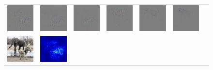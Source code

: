 \begin{figure}
\begin{center}
\begin{tabular}{ccccccc}
\includegraphics[width=0.14\linewidth,height=0.11\linewidth]{figs/examples/alexnet/soft/zeb-ele2_diff_341} &
\includegraphics[width=0.14\linewidth,height=0.11\linewidth]{figs/examples/vggnet/soft/zeb-ele2_diff_341} &
\includegraphics[width=0.14\linewidth,height=0.11\linewidth]{figs/examples/googlenet/soft/zeb-ele2_diff_341} &
\includegraphics[width=0.14\linewidth,height=0.11\linewidth]{figs/examples/alexnet/soft/zeb-ele2_diff_387} &
\includegraphics[width=0.14\linewidth,height=0.11\linewidth]{figs/examples/vggnet/soft/zeb-ele2_diff_387} &
\includegraphics[width=0.14\linewidth,height=0.11\linewidth]{figs/examples/googlenet/soft/zeb-ele2_diff_387} \\
\includegraphics[width=0.14\linewidth,height=0.11\linewidth]{figs/examples/googlenet/soft/zeb-ele2} &
\includegraphics[width=0.14\linewidth,height=0.11\linewidth]{figs/examples/alexnet/soft/zeb-ele2_sali_341} &

\end{tabular}
\end{center}
\end{figure}
